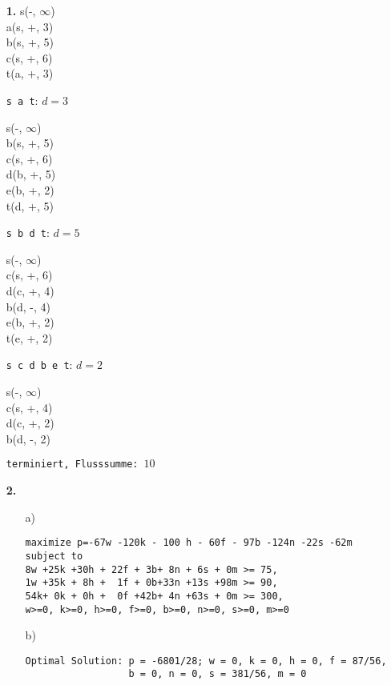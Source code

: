 \documentclass[a4paper,11pt]{article}
\author{\authorinfo}
\title{\titleinfo}
\date{\today}
\begin{document}
\maketitle
\begin{enumerate}

\item[\textbf{1.}]
    s(-, $\infty$) \\
    a(s, +, 3) \\
    b(s, +, 5) \\
    c(s, +, 6) \\
    t(a, +, 3)

    \texttt{s a t}: $d=3$

    s(-, $\infty$)\\
    b(s, +, 5)\\
    c(s, +, 6)\\
    d(b, +, 5)\\
    e(b, +, 2)\\
    t(d, +, 5)

    \texttt{s b d t}: $d=5$


    s(-, $\infty$)\\
    c(s, +, 6)\\
    d(c, +, 4)\\
    b(d, -, 4)\\
    e(b, +, 2)\\
    t(e, +, 2)

    \texttt{s c d b e t}: $d=2$

    s(-, $\infty$)\\
    c(s, +, 4)\\
    d(c, +, 2)\\
    b(d, -, 2)

    \texttt{terminiert, Flusssumme: $10$}

\newpage
\item[\textbf{2.}]
    \begin{enumerate}
    \item[a)]
        \begin{verbatim}
maximize p=-67w -120k - 100 h - 60f - 97b -124n -22s -62m subject to
8w +25k +30h + 22f + 3b+ 8n + 6s + 0m >= 75,
1w +35k + 8h +  1f + 0b+33n +13s +98m >= 90,
54k+ 0k + 0h +  0f +42b+ 4n +63s + 0m >= 300,
w>=0, k>=0, h>=0, f>=0, b>=0, n>=0, s>=0, m>=0
        \end{verbatim}

    \item[b)]
        \begin{verbatim}
Optimal Solution: p = -6801/28; w = 0, k = 0, h = 0, f = 87/56,
                  b = 0, n = 0, s = 381/56, m = 0
        \end{verbatim}


\end{enumerate}
\end{enumerate}
\end{document}
